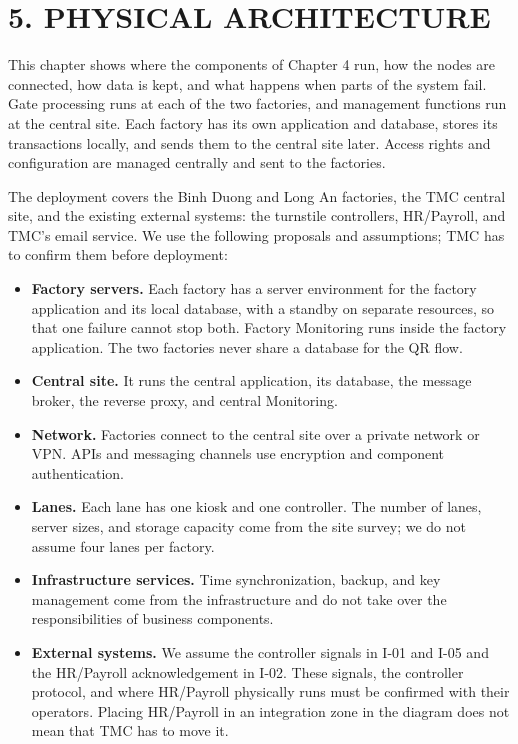 \section*{5. PHYSICAL ARCHITECTURE}

{}

This chapter shows where the components of Chapter 4 run, how the nodes are connected, how data is kept, and what happens when parts of the system fail. Gate processing runs at each of the two factories, and management functions run at the central site. Each factory has its own application and database, stores its transactions locally, and sends them to the central site later. Access rights and configuration are managed centrally and sent to the factories.

The deployment covers the Binh Duong and Long An factories, the TMC central site, and the existing external systems: the turnstile controllers, HR/Payroll, and TMC's email service. We use the following proposals and assumptions; TMC has to confirm them before deployment:

\begin{itemize}[leftmargin=36pt, itemsep=2pt, topsep=4pt, parsep=2pt]
  \item \textbf{Factory servers.} Each factory has a server environment for the factory application and its local database, with a standby on separate resources, so that one failure cannot stop both. Factory Monitoring runs inside the factory application. The two factories never share a database for the QR flow.
  \item \textbf{Central site.} It runs the central application, its database, the message broker, the reverse proxy, and central Monitoring.
  \item \textbf{Network.} Factories connect to the central site over a private network or VPN. APIs and messaging channels use encryption and component authentication.
  \item \textbf{Lanes.} Each lane has one kiosk and one controller. The number of lanes, server sizes, and storage capacity come from the site survey; we do not assume four lanes per factory.
  \item \textbf{Infrastructure services.} Time synchronization, backup, and key management come from the infrastructure and do not take over the responsibilities of business components.
  \item \textbf{External systems.} We assume the controller signals in I-01 and I-05 and the HR/Payroll acknowledgement in I-02. These signals, the controller protocol, and where HR/Payroll physically runs must be confirmed with their operators. Placing HR/Payroll in an integration zone in the diagram does not mean that TMC has to move it.
\end{itemize}

